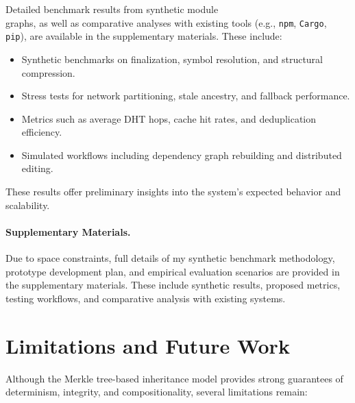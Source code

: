 \documentclass[sigplan,screen]{acmart}
\begin{document}
Detailed benchmark results from synthetic module \\graphs, as well as comparative analyses with existing tools (e.g., \texttt{npm}, \texttt{Cargo}, \texttt{pip}), are available in the supplementary materials. These include:

\begin{itemize}
	\item Synthetic benchmarks on finalization, symbol resolution, and structural compression.
	\item Stress tests for network partitioning, stale ancestry, and fallback performance.
	\item Metrics such as average DHT hops, cache hit rates, and deduplication efficiency.
	\item Simulated workflows including dependency graph rebuilding and distributed editing.
\end{itemize}

These results offer preliminary insights into the system's expected behavior and scalability.

\paragraph{Supplementary Materials.}
Due to space constraints, full details of my synthetic benchmark methodology, prototype development plan, and empirical evaluation scenarios are provided in the supplementary materials. These include synthetic results, proposed metrics, testing workflows, and comparative analysis with existing systems.

\section{Limitations and Future Work}
\label{sec:limitations-future}

Although the Merkle tree-based inheritance model provides strong guarantees of determinism, integrity, and compositionality, several limitations remain:
\end{document}
